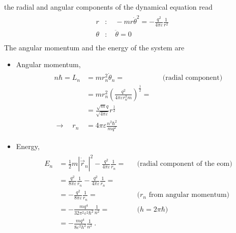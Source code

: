 \documentclass[letterpaper,10pt,english]{jupyterBook}
\begin{document}
\sphinxAtStartPar
the radial and angular components of the dynamical equation read
\begin{equation*}
\begin{split}\begin{aligned}
  r      & : \quad - m r \dot{\theta}^2 = - \frac{q^2}{4 \pi \varepsilon} \frac{1}{r^2} \\
  \theta & : \quad \ddot{\theta} = 0 \\
\end{aligned}\end{split}
\end{equation*}
\sphinxAtStartPar
The angular momentum and the energy of the system are
\begin{itemize}
\item {} 
\sphinxAtStartPar
Angular momentum,
\begin{equation*}
\begin{split}\begin{aligned}
     n \hbar = L_n 
     & = m r_n^2 \dot{\theta}_n =  && \text{(radial component)} \\
     & = m r_n^2 \left( \frac{q^2}{4 \pi \varepsilon r_n^3 m} \right)^{\frac{1}{2}} = \\
     & =  \frac{\sqrt{m} q}{\sqrt{ 4 \pi \varepsilon}} r^{\frac{1}{2}} \\
     \rightarrow \quad r_n & = 4 \pi \varepsilon \frac{n^2 \hbar^2}{m q^2}
   \end{aligned}\end{split}
\end{equation*}
\item {} 
\sphinxAtStartPar
Energy,
\begin{equation}\label{equation:ch/quantum-mechanics/atom-models/bohr:eq:atom:bohr:energy}
\begin{split}\begin{aligned}
    E_n 
    & = \frac{1}{2} m |\dot{\vec{r}}_n|^2 - \frac{q^2}{4 \pi \varepsilon} \frac{1}{r_n} =  && \text{(radial component of the eom)} \\
    & = \frac{q^2}{8 \pi \varepsilon} \frac{1}{r_n} - \frac{q^2}{4 \pi \varepsilon} \frac{1}{r_n} = \\
    & = - \frac{q^2}{8 \pi \varepsilon} \frac{1}{r_n} = && \text{($r_n$ from angular momentum)} \\
    & = - \frac{m q^4}{32 \pi^2 \varepsilon^2 \hbar^2} \frac{1}{n^2} = && \text{($h = 2 \pi \hbar$)} \\
    & = - \frac{m q^4}{8 \varepsilon^2 h^2}\frac{1}{n^2} \ .
  \end{aligned}\end{split}
\end{equation}
\end{itemize}
\end{document}
